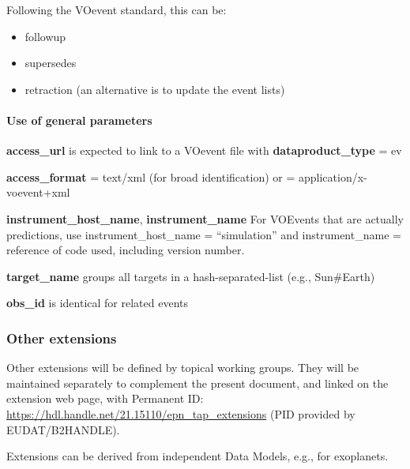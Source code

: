 \documentclass[11pt,a4paper]{ivoa}
\begin{document}
Following the VOevent standard, this can be:

\begin{itemize}
\item followup
\item supersedes
\item retraction (an alternative is to update the event lists)
\end{itemize}


\paragraph{Use of general parameters}

\textbf{access\_url} is expected to link to a VOevent file with
\textbf{dataproduct\_type} = ev

\textbf{access\_format} = text/xml (for broad identification) or =
application/x-voevent+xml

\textbf{instrument\_host\_name}, \textbf{instrument\_name} For
VOEvents that are actually predictions, use instrument\_host\_name = ``simulation''
and instrument\_name = reference of code used, including version number.

\textbf{target\_name} groups all targets in a hash-separated-list
(e.g., Sun\#Earth)

\textbf{obs\_id} is identical for related events

\subsubsection{Other extensions}

Other extensions will be defined by topical working groups.
They will be maintained separately to complement the present document, and linked on the extension web page, with Permanent ID: \url{https://hdl.handle.net/21.15110/epn_tap_extensions} (PID provided by EUDAT/B2HANDLE).

Extensions can be derived from independent Data Models,
e.g., for exoplanets.



\end{document}
